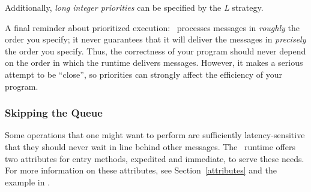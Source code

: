 Additionally, {\sl long integer priorities} can be specified by the {\em L} strategy. 

A final reminder about prioritized execution: \charmpp\ processes
messages in {\it roughly} the order you specify; it never guarantees
that it will deliver the messages in {\it precisely} the
order you specify. Thus, the correctness
of your program should never depend on the order in which the runtime
delivers messages. However, it makes a serious attempt to be
``close'', so priorities can strongly affect the efficiency of your
program.

\subsubsection{Skipping the Queue}

Some operations that one might want to perform are sufficiently
latency-sensitive that they should never wait in line behind other
messages. The \charmpp\ runtime offers two attributes for entry
methods, {\kw expedited} and {\kw immediate}, to serve these
needs. For more information on these attributes, see
Section~\ref{attributes} and the example in
  .
